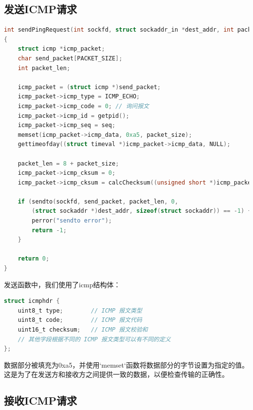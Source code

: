 \documentclass[12pt]{ctexart}
\begin{document}
    \subsection{发送ICMP请求}

    \begin{lstlisting}[language = C]
int sendPingRequest(int sockfd, struct sockaddr_in *dest_addr, int packet_size, int seq)
{
    struct icmp *icmp_packet;
    char send_packet[PACKET_SIZE];
    int packet_len;

    icmp_packet = (struct icmp *)send_packet;
    icmp_packet->icmp_type = ICMP_ECHO;
    icmp_packet->icmp_code = 0; // 询问报文  
    icmp_packet->icmp_id = getpid();
    icmp_packet->icmp_seq = seq;
    memset(icmp_packet->icmp_data, 0xa5, packet_size);
    gettimeofday((struct timeval *)icmp_packet->icmp_data, NULL);

    packet_len = 8 + packet_size;
    icmp_packet->icmp_cksum = 0;
    icmp_packet->icmp_cksum = calcChecksum((unsigned short *)icmp_packet, packet_len);

    if (sendto(sockfd, send_packet, packet_len, 0, 
        (struct sockaddr *)dest_addr, sizeof(struct sockaddr)) == -1) {
        perror("sendto error");
        return -1;
    }

    return 0;
}        
    \end{lstlisting}

    发送函数中，我们使用了icmp结构体：
    \begin{lstlisting}[language = C]
struct icmphdr {
    uint8_t type;        // ICMP 报文类型
    uint8_t code;        // ICMP 报文代码
    uint16_t checksum;   // ICMP 报文校验和
    // 其他字段根据不同的 ICMP 报文类型可以有不同的定义
};
\end{lstlisting}

    数据部分被填充为0xa5，并使用`memset`函数将数据部分的字节设置为指定的值。这是为了在发送方和接收方之间提供一致的数据，以便检查传输的正确性。

    \subsection{接收ICMP请求}
\end{document}

